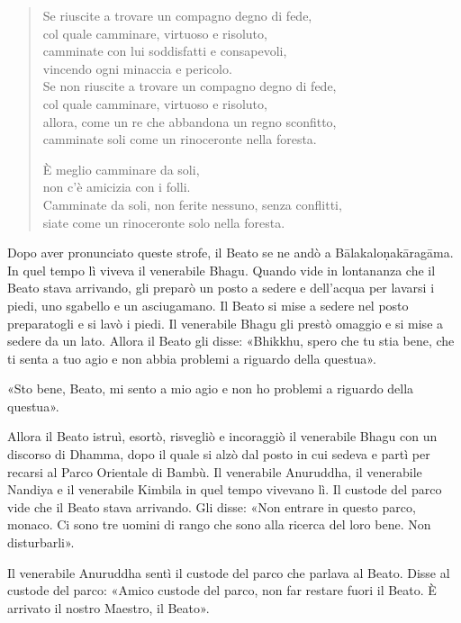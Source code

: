 \begin{quote}
Se riuscite a trovare un compagno degno di fede, \\
col quale camminare, virtuoso e risoluto, \\
camminate con lui soddisfatti e consapevoli, \\
vincendo ogni minaccia e pericolo. \\
Se non riuscite a trovare un compagno degno di fede, \\
col quale camminare, virtuoso e risoluto, \\
allora, come un re che abbandona un regno sconfitto, \\
camminate soli come un rinoceronte nella foresta.

È meglio camminare da soli, \\
non c’è amicizia con i folli. \\
Camminate da soli, non ferite nessuno, senza conflitti, \\
siate come un rinoceronte solo nella foresta.
\end{quote}


Dopo aver pronunciato queste strofe, il Beato se ne andò a Bālakaloṇakāragāma.
In quel tempo lì viveva il venerabile Bhagu. Quando vide in lontananza che il
Beato stava arrivando, gli preparò un posto a sedere e dell’acqua per lavarsi i
piedi, uno sgabello e un asciugamano. Il Beato si mise a sedere nel posto
preparatogli e si lavò i piedi. Il venerabile Bhagu gli prestò omaggio e si mise
a sedere da un lato. Allora il Beato gli disse: «Bhikkhu, spero che tu stia
bene, che ti senta a tuo agio e non abbia problemi a riguardo della questua».

«Sto bene, Beato, mi sento a mio agio e non ho problemi a riguardo della
questua».

Allora il Beato istruì, esortò, risvegliò e incoraggiò il venerabile Bhagu con
un discorso di Dhamma, dopo il quale si alzò dal posto in cui sedeva e partì per
recarsi al Parco Orientale di Bambù. Il venerabile Anuruddha, il venerabile
Nandiya e il venerabile Kimbila in quel tempo vivevano lì. Il custode del parco
vide che il Beato stava arrivando. Gli disse: «Non entrare in questo parco,
monaco. Ci sono tre uomini di rango che sono alla ricerca del loro bene. Non
disturbarli».

Il venerabile Anuruddha sentì il custode del parco che parlava al Beato. Disse
al custode del parco: «Amico custode del parco, non far restare fuori il Beato.
È arrivato il nostro Maestro, il Beato».

